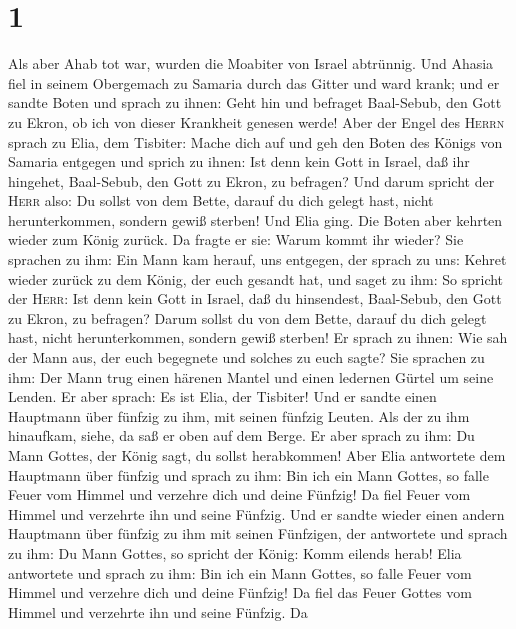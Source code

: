 \hypertarget{section}{%
\section{1}\label{section}}

 Als aber Ahab tot war, wurden die Moabiter von Israel
abtrünnig. Und Ahasia fiel in seinem Obergemach zu Samaria durch das
Gitter und ward krank;  und er sandte Boten und sprach zu
ihnen: Geht hin und befraget Baal-Sebub, den Gott zu Ekron, ob ich von
dieser Krankheit genesen werde!  Aber der Engel des
\textsc{Herrn} sprach zu Elia, dem Tisbiter: Mache dich auf und geh den
Boten des Königs von Samaria entgegen und sprich zu ihnen: Ist denn kein
Gott in Israel, daß ihr hingehet, Baal-Sebub, den Gott zu Ekron, zu
befragen?  Und darum spricht der \textsc{Herr} also: Du
sollst von dem Bette, darauf du dich gelegt hast, nicht herunterkommen,
sondern gewiß sterben!  Und Elia ging. Die Boten aber
kehrten wieder zum König zurück. Da fragte er sie:  Warum
kommt ihr wieder? Sie sprachen zu ihm: Ein Mann kam herauf, uns
entgegen, der sprach zu uns: Kehret wieder zurück zu dem König, der euch
gesandt hat, und saget zu ihm: So spricht der \textsc{Herr}: Ist denn
kein Gott in Israel, daß du hinsendest, Baal-Sebub, den Gott zu Ekron,
zu befragen? Darum sollst du von dem Bette, darauf du dich gelegt hast,
nicht herunterkommen, sondern gewiß sterben!  Er sprach zu
ihnen: Wie sah der Mann aus, der euch begegnete und solches zu euch
sagte?  Sie sprachen zu ihm: Der Mann trug einen härenen
Mantel und einen ledernen Gürtel um seine Lenden. Er aber sprach: Es ist
Elia, der Tisbiter!  Und er sandte einen Hauptmann über
fünfzig zu ihm, mit seinen fünfzig Leuten. Als der zu ihm hinaufkam,
siehe, da saß er oben auf dem Berge. Er aber sprach zu ihm: Du Mann
Gottes,  der König sagt, du sollst herabkommen! Aber Elia
antwortete dem Hauptmann über fünfzig und sprach zu ihm: Bin ich ein
Mann Gottes, so falle Feuer vom Himmel und verzehre dich und deine
Fünfzig! Da fiel Feuer vom Himmel und verzehrte ihn und seine Fünfzig.
 Und er sandte wieder einen andern Hauptmann über fünfzig
zu ihm mit seinen Fünfzigen, der antwortete und sprach zu ihm: Du Mann
Gottes, so spricht der König: Komm eilends herab!  Elia
antwortete und sprach zu ihm: Bin ich ein Mann Gottes, so falle Feuer
vom Himmel und verzehre dich und deine Fünfzig! Da fiel das Feuer Gottes
vom Himmel und verzehrte ihn und seine Fünfzig.  Da
